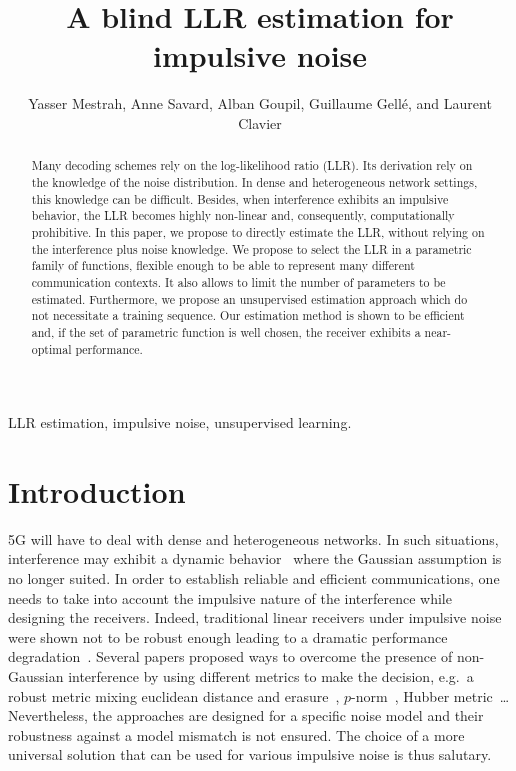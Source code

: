 \documentclass[a4paper]{IEEEtran}
\title{A blind LLR estimation for impulsive noise}
\author{Yasser Mestrah,
  Anne Savard,
  Alban Goupil,
  Guillaume Gellé,
  and Laurent Clavier}
\begin{document}
 \maketitle


\begin{abstract}
  Many decoding schemes rely on the log-likelihood ratio
  (LLR). Its derivation rely on the knowledge of the noise
  distribution. In dense and heterogeneous network settings,
  this knowledge can be difficult. Besides, when
  interference exhibits an impulsive behavior, the LLR
  becomes highly non-linear and, consequently,
  computationally prohibitive. In this paper, we propose to
  directly estimate the LLR, without relying on the
  interference plus noise knowledge. We propose to select
  the LLR in a parametric family of functions, flexible
  enough to be able to represent many different
  communication contexts. It also allows to limit the number
  of parameters to be estimated. Furthermore, we propose an
  unsupervised estimation approach which do not necessitate
  a training sequence. Our estimation method is shown to be
  efficient and, if the set of parametric function is well
  chosen, the receiver exhibits a near-optimal performance.
\end{abstract}


\begin{IEEEkeywords}
  LLR estimation, impulsive noise, unsupervised learning.
\end{IEEEkeywords}




\section{Introduction}

5G will have to deal with dense and heterogeneous networks.
In such situations, interference may exhibit a dynamic
behavior~\cite{PM-2010-2,P-2010,Egan2017} where the Gaussian
assumption is no longer suited. In order to establish
reliable and efficient communications, one needs to take
into account the impulsive nature of the interference while
designing the receivers. Indeed, traditional linear
receivers under impulsive noise were shown not to be robust
enough leading to a dramatic performance
degradation~\cite{PM-2010-1}. Several papers proposed ways
to overcome the presence of non-Gaussian interference by
using different metrics to make the decision, e.g.\ a robust
metric mixing euclidean distance and erasure~\cite{DG-2009},
$p$-norm~\cite{WL-2012}, Hubber metric~\cite{T-2005}\dots{}
Nevertheless, the approaches are designed for a specific
noise model and their robustness against a model mismatch is
not ensured. The choice of a more universal solution that
can be used for various impulsive noise is thus salutary.
\end{document}
